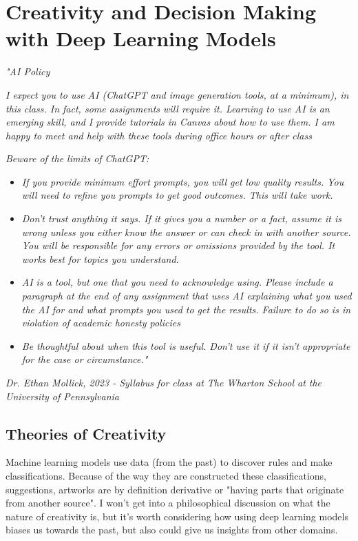 \setchapterpreamble[u]{\margintoc}
\chapter{Creativity and Decision Making with Deep Learning Models}

\textit{"AI Policy}

\textit{I expect you to use AI (ChatGPT and image generation tools, at a minimum), in this class. In fact, some assignments will require it. Learning to use AI is an emerging skill, and I provide tutorials in Canvas about how to use them. I am happy to meet and help with these tools during office hours or after class}

\textit{Beware of the limits of ChatGPT:}

\begin{itemize}
	\item\textit{If you provide minimum effort prompts, you will get low quality results. You will need to refine you prompts to get good outcomes. This will take work.}
	\item\textit{Don't trust anything it says. If it gives you a number or a fact, assume it is wrong unless you either know the answer or can check in with another source. You will be responsible for any errors or omissions provided by the tool. It works best for topics you understand.}
	\item\textit{AI is a tool, but one that you need to acknowledge using. Please include a paragraph at the end of any assignment that uses AI explaining what you used the AI for and what prompts you used to get the results. Failure to do so is in violation of academic honesty policies}
	\item\textit{Be thoughtful about when this tool is useful. Don't use it if it isn't appropriate for the case or circumstance."}
\end{itemize}

\textit{Dr. Ethan Mollick, 2023 - Syllabus for class at The Wharton School at the University of Pennsylvania}


\section{Theories of Creativity}

Machine learning models use data (from the past) to discover rules and make classifications. Because of the way they are constructed these classifications, suggestions, artworks are by definition derivative or "having parts that originate from another source". I won't get into a philosophical discussion on what the nature of creativity is, but it's worth considering how using deep learning models biases us towards the past, but also could give us insights from other domains. 

